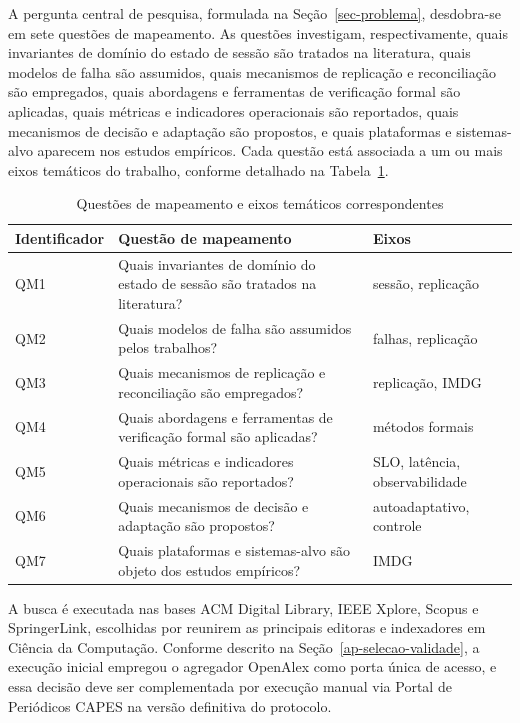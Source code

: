 A pergunta central de pesquisa, formulada na Seção~\ref{sec-problema}, desdobra-se em sete questões de mapeamento. As questões investigam, respectivamente, quais invariantes de domínio do estado de sessão são tratados na literatura, quais modelos de falha são assumidos, quais mecanismos de replicação e reconciliação são empregados, quais abordagens e ferramentas de verificação formal são aplicadas, quais métricas e indicadores operacionais são reportados, quais mecanismos de decisão e adaptação são propostos, e quais plataformas e sistemas-alvo aparecem nos estudos empíricos. Cada questão está associada a um ou mais eixos temáticos do trabalho, conforme detalhado na Tabela~\ref{qd-qm}.

\begin{table}[h]
\captionsetup{type=table, name=Tabela}
\caption{Questões de mapeamento e eixos temáticos correspondentes}
\centering
\begin{tabular}{p{2.3cm}p{9cm}p{2.6cm}}
\hline
\textbf{Identificador} & \textbf{Questão de mapeamento} & \textbf{Eixos} \\
\hline
QM1 & Quais invariantes de domínio do estado de sessão são tratados na literatura? & sessão, replicação \\
QM2 & Quais modelos de falha são assumidos pelos trabalhos? & falhas, replicação \\
QM3 & Quais mecanismos de replicação e reconciliação são empregados? & replicação, IMDG \\
QM4 & Quais abordagens e ferramentas de verificação formal são aplicadas? & métodos formais \\
QM5 & Quais métricas e indicadores operacionais são reportados? & SLO, latência, observabilidade \\
QM6 & Quais mecanismos de decisão e adaptação são propostos? & autoadaptativo, controle \\
QM7 & Quais plataformas e sistemas-alvo são objeto dos estudos empíricos? & IMDG \\
\hline
\end{tabular}
\label{qd-qm}
\end{table}

\label{ap-bases-strings}A busca é executada nas bases ACM Digital Library, IEEE Xplore, Scopus e SpringerLink, escolhidas por reunirem as principais editoras e indexadores em Ciência da Computação. Conforme descrito na Seção~\ref{ap-selecao-validade}, a execução inicial empregou o agregador OpenAlex como porta única de acesso, e essa decisão deve ser complementada por execução manual via Portal de Periódicos CAPES na versão definitiva do protocolo. 

